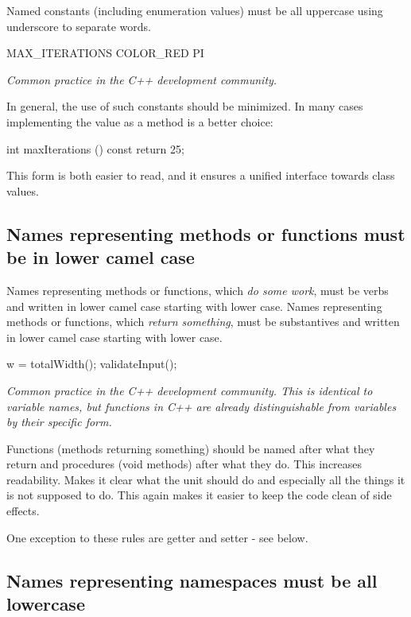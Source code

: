 \documentclass[a4paper,11pt,oneside]{scrbook}
\newcommand{\guideline}[1]{{\subsection{#1}}}
\newcommand{\motivation}[1]{{\normalfont \itshape #1}}
\begin{document}
Named constants (including enumeration values) must be all uppercase
using underscore to separate words.

\begin{code}
  MAX_ITERATIONS
  COLOR_RED
  PI 
\end{code}

\motivation{
  Common practice in the C++ development community. 
}

In general, the use of such constants should be minimized. In many cases
implementing the value as a method is a better choice:

\begin{code}
  int maxIterations () const {
    return 25;
  } 
\end{code}

This form is both easier to read, and it ensures a unified interface towards
class values.

\guideline{Names representing methods or functions must be in lower camel case}

Names representing methods or functions, which \emph{do some work}, must be
verbs and written in lower camel case starting with lower case. Names
representing methods or functions, which \emph{return something}, must be
substantives and written in lower camel case starting with lower case.

\begin{code}
  w = totalWidth();
  validateInput();
\end{code}

\motivation{ 
  Common practice in the C++ development community. This is identical to
  variable names, but functions in C++ are already distinguishable from
  variables by their specific form.

  Functions (methods returning something) should be named after what they return
  and procedures (void methods) after what they do.  This increases
  readability. Makes it clear what the unit should do and especially all the
  things it is not supposed to do. This again makes it easier to keep the code
  clean of side effects.
}

One exception to these rules are getter and setter - see below.
  
\guideline{Names representing namespaces must be all lowercase}
\end{document}
